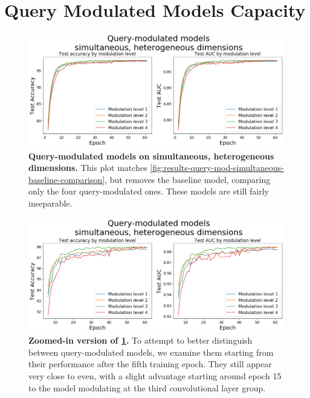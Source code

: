 \section{Query Modulated Models Capacity \label{sec:additional-figures-query-mod-simultaneous}}

\begin{figure}[!htb]
\centering
\includegraphics[width=\linewidth]{ch-results/figures/query_mod_simultaneous/query_mod_only.png}
\caption{ {\bf Query-modulated models on simultaneous, heterogeneous dimensions.} This plot matches \ref{fig:results-query-mod-simultaneous-baseline-comparison}, but removes the baseline model, comparing only the four query-modulated ones. These models are still fairly inseparable.}
\label{fig:results-query-mod-simultaneous-query-mod-only}
\end{figure}

\begin{figure}[!htb]
\centering
\includegraphics[width=\linewidth]{ch-results/figures/query_mod_simultaneous/query_mod_zoomed.png}
\caption{ {\bf Zoomed-in version of \ref{fig:results-query-mod-simultaneous-query-mod-only}.} To attempt to better distinguish between query-modulated models, we examine them starting from their performance after the fifth training epoch. They still appear very close to even, with a slight advantage starting around epoch 15 to the model modulating at the third convolutional layer group.}
\label{fig:results-query-mod-simultaneous-query-mod-zoomed}
\end{figure}
